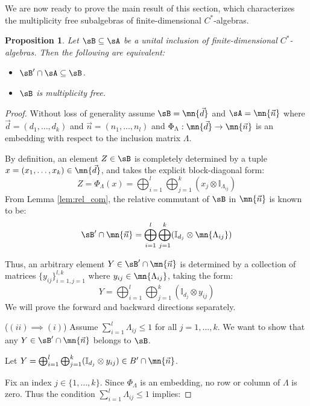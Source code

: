 \documentclass[12pt,a4paper]{amsart}
\theoremstyle{plain}
\newtheorem{prop}[theorem]{Proposition}
\theoremstyle{definition}
\theoremstyle{remark}
\numberwithin{equation}{section}
\theoremstyle{ser}
\theoremstyle{serr}
\theoremstyle{ser}
\theoremstyle{ser}
\theoremstyle{collabquestion}
\newcommand{\<}{\langle}
\renewcommand{\>}{\rangle}
\begin{document}
We are now ready to prove the main result of this section, which characterizes the multiplicity free subalgebras of finite-dimensional $C^*$-algebras.
\begin{prop}\label{lem:mult_free_iff_rel_com}
    Let $\sB\subseteq\sA$ be a unital inclusion of finite-dimensional $C^*$-algebras. Then the following are equivalent: 
    \begin{itemize}
        \item[(i)] $\sB' \cap \sA \subseteq \sB$.
        \item[(ii)] $\sB$ is multiplicity free.
    \end{itemize}
\end{prop}
\begin{proof}
    Without loss of generality assume $\sB = \mn{\vec{d}}$ and $\sA= \mn{\vec{n}}$ where $\vec{d}= (d_1, \dots, d_k)$ and $\vec{n} = (n_1, \dots, n_l)$ and $\Phi_\Lambda:\mn{\vec{d}}\to \mn{\vec{n}}$ is an embedding with respect to the inclusion matrix $\Lambda$. 

    By definition, an element $Z \in \sB$ is completely determined by a tuple $x = (x_1, \dots, x_k) \in \mn{\vec{d}}$, and takes the explicit block-diagonal form:
    $$Z = \Phi_\Lambda(x) = \bigoplus_{i=1}^l \bigoplus_{j=1}^k (x_j \otimes \mathbb{I}_{\Lambda_{ij}})$$
    From Lemma \ref{lem:rel_com}, the relative commutant of $\sB$ in $\mn{\vec{n}}$ is known to be:
    $$\sB' \cap \mn{\vec{n}} = \bigoplus_{i=1}^l \bigoplus_{j=1}^k (\mathbb{I}_{d_j} \otimes \mn{\Lambda_{ij}})$$

    Thus, an arbitrary element $Y \in \sB' \cap \mn{\vec{n}}$ is determined by a collection of matrices $\{y_{ij}\}_{i=1, j=1}^{l, k}$ where $y_{ij} \in \mn{\Lambda_{ij}}$, taking the form:$$Y = \bigoplus_{i=1}^l \bigoplus_{j=1}^k (\mathbb{I}_{d_j} \otimes y_{ij})$$We will prove the forward and backward directions separately.

    \vspace{0.3cm}
    \noindent($(ii)\implies (i)$) Assume $\sum_{i=1}^l \Lambda_{ij} \le 1$ for all $j=1, \dots, k$. We want to show that any $Y \in \sB' \cap \mn{\vec{n}}$ belongs to $\sB$. 
    
    Let $Y = \bigoplus_{i=1}^l \bigoplus_{j=1}^k (\mathbb{I}_{d_j} \otimes y_{ij}) \in B' \cap \mn{\vec{n}}$. 
    
    Fix an index $j \in \{1, \dots, k\}$. Since $\Phi_\Lambda$ is an embedding, no row or column of $\Lambda$ is zero. Thus the condition $\sum_{i=1}^l \Lambda_{ij} \le 1$ implies:


\end{proof}
\end{document}
